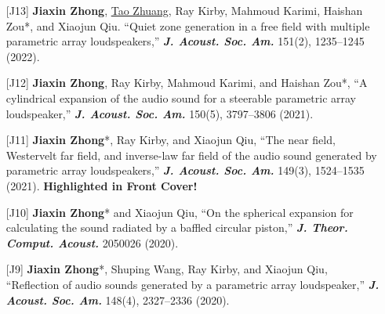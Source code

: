 \documentclass[10pt,a4paper,ragged2e,withhyper]{altacv}
\newcommand{\PubJournal}[1]{\textbf{\textit{#1}}}
\newcommand{\PubTitle}[1]{``{#1,}''}
\newcommand{\PubCorAuthor}[1]{#1*}
\newcommand{\PubMe}[1]{\textbf{#1}}
\begin{document}
\begin{itemize}[leftmargin = 30pt]
    \item[{[J13]}]
    \PubMe{Jiaxin Zhong}, \underline{Tao Zhuang}, Ray Kirby, Mahmoud Karimi, \PubCorAuthor{Haishan Zou}, and Xiaojun
    Qiu.
    \PubTitle{Quiet zone generation in a free field with multiple parametric array loudspeakers}
    \PubJournal{J. Acoust. Soc. Am.} 151(2), 1235--1245 (2022).
    \href{https://doi.org/10.1121/10.0009587}{\color{accent}\aiDoi}
    \href{https://github.com/JiaxinZhong/JiaxinZhong.github.io/raw/master/publications/journal/Zhong2022-JASA-PAL_ANC.pdf}{\color{accent}\faFilePdf[regular]}

    \item[{[J12]}]
    \PubMe{Jiaxin Zhong}, Ray Kirby, Mahmoud Karimi, and \PubCorAuthor{Haishan Zou},
    \PubTitle{A cylindrical expansion of the audio sound for a steerable parametric array loudspeaker}
    \PubJournal{J. Acoust. Soc. Am.}
    150(5), 3797--3806 (2021).
    \href{https://doi.org/10.1121/10.0007280}{\color{accent}\aiDoi}
    \href{https://github.com/JiaxinZhong/JiaxinZhong.github.io/raw/master/publications/journal/Zhong2021-JASA-PAL_cylindrical_expansion.pdf}{\color{accent}\faFilePdf[regular]}

    \item[{[J11]}]
    \PubCorAuthor{\PubMe{Jiaxin Zhong}}, Ray Kirby, and Xiaojun Qiu,
    \PubTitle{The near field, Westervelt far field, and inverse-law far field of the audio sound generated by parametric array loudspeakers}
    \PubJournal{J. Acoust. Soc. Am.}
    149(3), 1524--1535 (2021).
    \href{https://doi.org/10.1121/10.0003606}{\color{accent}\aiDoi}
    \href{https://github.com/JiaxinZhong/JiaxinZhong.github.io/raw/master/publications/journal/Zhong2021-JASA-PAL_sound_field.pdf}{\color{accent}\faFilePdf[regular]}
    \textbf{Highlighted in Front Cover!}

    \item[{[J10]}]
    \PubCorAuthor{\PubMe{Jiaxin Zhong}} and Xiaojun Qiu,
    \PubTitle{On the spherical expansion for calculating the sound radiated by a baffled circular piston}
    \PubJournal{J. Theor. Comput. Acoust.}
    2050026 (2020).
    \href{https://doi.org/10.1142/S2591728520500267}{\color{accent}\aiDoi}
    \href{https://github.com/JiaxinZhong/JiaxinZhong.github.io/raw/master/publications/journal/Zhong2020-JTCA-Piston_radiation.pdf}{\color{accent}\faFilePdf[regular]}

    \item[{[J9]}]
    \PubCorAuthor{\textbf{Jiaxin Zhong}}, Shuping Wang, Ray Kirby, and Xiaojun Qiu,
    \PubTitle{Reflection of audio sounds generated by a parametric array loudspeaker}
    \PubJournal{J. Acoust. Soc. Am.}
    148(4), 2327--2336 (2020).
    \href{https://doi.org/10.1121/10.0002161}{\color{accent}\aiDoi}
    \href{https://github.com/JiaxinZhong/JiaxinZhong.github.io/raw/master/publications/journal/Zhong2020-JASA-PAL_reflection.pdf}{\color{accent}\faFilePdf[regular]}


\end{itemize}
\end{document}
